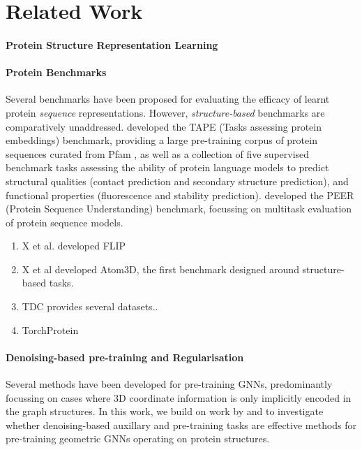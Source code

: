 \section{Related Work}

\paragraph{Protein Structure Representation Learning}




\paragraph{Protein Benchmarks} Several benchmarks have been proposed for evaluating the efficacy of learnt protein \emph{sequence} representations. However, \emph{structure-based} benchmarks are comparatively unaddressed. \citet{tape} developed the TAPE (Tasks assessing protein embeddings) benchmark, providing a large pre-training corpus of protein sequences curated from Pfam \cite{ElGebali2018}, as well as a collection of five supervised benchmark tasks assessing the ability of protein language models to predict structural qualities (contact prediction and secondary structure prediction), and functional properties (fluorescence and stability prediction). \citet{peer} developed the PEER (Protein Sequence Understanding) benchmark, focussing on multitask evaluation of protein sequence models. 

\begin{enumerate}
    \item X et al. developed FLIP
    \item X et al developed Atom3D, the first benchmark designed around structure-based tasks.
    \item TDC provides several datasets..
    \item TorchProtein
\end{enumerate}



\paragraph{Denoising-based pre-training and Regularisation} 
Several methods have been developed for pre-training GNNs, predominantly focussing on cases where 3D coordinate information is only implicitly encoded in the graph structures. In this work, we build on work by \citet{godwin2021simple} and \citet{zaidi2023pretraining} to investigate whether denoising-based auxillary and pre-training tasks are effective methods for pre-training geometric GNNs operating on protein structures.